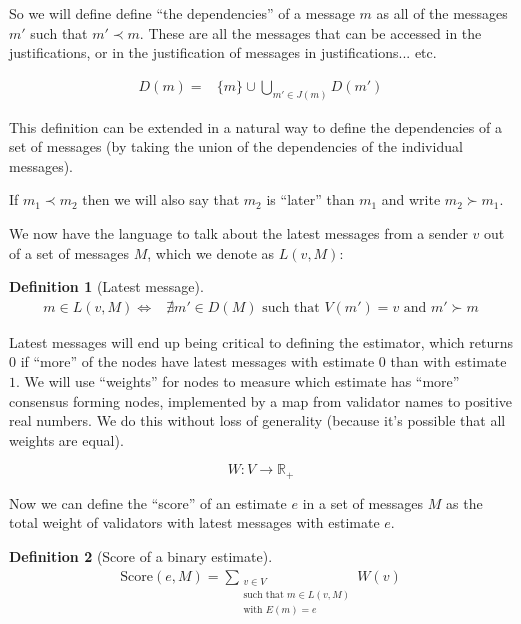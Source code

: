 \documentclass{article}
\theoremstyle{definition}
\newtheorem{defn}{Definition}[section]
\begin{document}
So we will define define ``the dependencies'' of a message $m$ as all of the messages $m'$ such that $m' \prec m$. These are all the messages that can be accessed in the justifications, or in the justification of messages in justifications... etc.

\begin{equation*}
\begin{split}
D(m) = &\{m\}\cup \bigcup_{m' \in J(m)} D(m') 
\end{split}
\end{equation*}

This definition can be extended in a natural way to define the dependencies of a set of messages (by taking the union of the dependencies of the individual messages).

If $m_1 \prec m_2$ then we will also say that $m_2$ is ``later'' than $m_1$ and write $m_2 \succ m_1$.

We now have the language to talk about the latest messages from a sender $v$ out of a set of messages $M$, which we denote as $L(v, M)$:

\begin{defn}[Latest message]
\begin{equation*}
\begin{split}
m \in L(v, M) \iff & \nexists m' \in D(M) \text{ such that } V(m') = v \text{ and } m' \succ m
\end{split}
\end{equation*}
\end{defn}

Latest messages will end up being critical to defining the estimator, which returns $0$ if ``more'' of the nodes have latest messages with estimate $0$ than with estimate $1$. We will use ``weights'' for nodes to measure which estimate has ``more'' consensus forming nodes, implemented by a map from validator names to positive real numbers. We do this without loss of generality (because it's possible that all weights are equal).

$$
W:V \to \mathbb{R}_+
$$


Now we can define the ``score'' of an estimate $e$ in a set of messages $M$ as the total weight of validators with latest messages with estimate $e$.

\begin{defn}[Score of a binary estimate]
\begin{align}
\text{Score}(e, M) = \sum_{\substack{v \in V \\ \text{such that } m \in L(v,M) \\ \text{with } E(m) = e}} W(v)
\end{align}
\end{defn}
\end{document}
